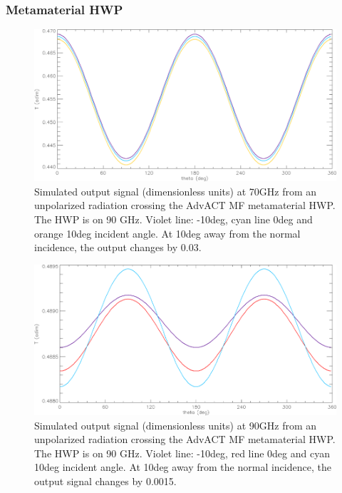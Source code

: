 

\subsubsection{Metamaterial HWP}

\begin{figure}
\centering
\includegraphics[width=0.6\linewidth]{figures/meta1.png}
\caption{Simulated output signal (dimensionless units) at 70GHz from an unpolarized radiation crossing the AdvACT MF metamaterial HWP. The HWP is %
on 90 GHz. Violet line: -10deg, cyan line 0deg and orange 10deg incident angle. At 10deg away from the normal incidence, the output %
changes by 0.03.}\label{meta1}
\end{figure}

\begin{figure}
\centering
\includegraphics[width=0.6\linewidth]{figures/meta2.png}
\caption{Simulated output signal (dimensionless units) at 90GHz from an unpolarized radiation crossing the AdvACT MF metamaterial HWP. The HWP is %
on 90 GHz. Violet line: -10deg, red line 0deg and cyan 10deg incident angle. At 10deg away from the normal incidence, the output signal
changes by 0.0015.}\label{meta2}
\end{figure}

